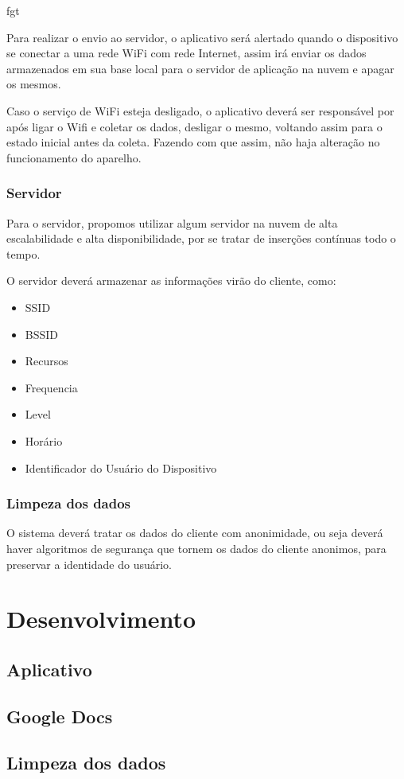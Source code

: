 fgt\documentclass[12pt, %
openright, 
oneside, %
a4paper,    %
brazil]{facom-ufu-abntex2}
\begin{document}
Para realizar o envio ao servidor, o aplicativo será alertado quando o dispositivo se conectar a uma rede WiFi com rede Internet, assim irá enviar os dados armazenados em sua base local para o servidor de aplicação na nuvem e apagar os mesmos. 

Caso o serviço de WiFi esteja desligado, o aplicativo deverá ser responsável por após ligar o Wifi e coletar os dados, desligar o mesmo, voltando assim para o estado inicial antes da coleta. Fazendo com que assim, não haja alteração no funcionamento do aparelho.




\subsection{Servidor}
Para o servidor, propomos utilizar algum servidor na nuvem de alta escalabilidade e alta disponibilidade, por se tratar de inserções contínuas todo o tempo.

O servidor deverá armazenar as informações virão do cliente, como:
\begin{itemize}
  \item SSID
  \item BSSID
  \item Recursos
  \item Frequencia
  \item Level
  \item Horário
  \item Identificador do Usuário do Dispositivo
  \end{itemize}
  
\subsection{Limpeza dos dados}
O sistema deverá tratar os dados do cliente com anonimidade, ou seja deverá haver algoritmos de segurança que tornem os dados do cliente anonimos, para preservar a identidade do usuário.
\chapter{Desenvolvimento}
\section{Aplicativo}
\section{Google Docs}
\section{Limpeza dos dados}
\end{document}
